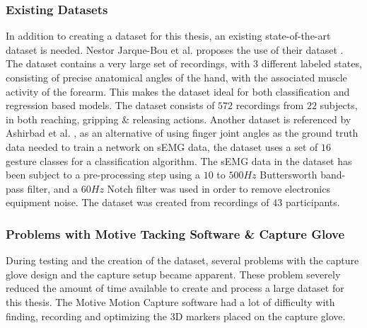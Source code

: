 \documentclass[../main.tex]{subfiles}
\begin{document}
\subsubsection{Existing Datasets}

In addition to creating a dataset for this thesis, an existing state-of-the-art dataset is needed.
Nestor Jarque-Bou et al. \cite{jarque2019} proposes the use of their dataset \cite{kinmusdataset}.
The dataset contains a very large set of recordings, with 3 different labeled states, consisting of precise anatomical angles of the hand, with the associated muscle activity of the forearm.
This makes the dataset ideal for both classification and regression based models.
The dataset consists of $572$ recordings from $22$ subjects, in both reaching, gripping \& releasing actions.
Another dataset is referenced by Ashirbad et al. \cite{ashirbad2022}, as an alternative of using finger joint angles as the ground truth data needed to train a network on sEMG data, the dataset uses a set of $16$ gesture classes for a classification algorithm.
The sEMG data in the dataset has been subject to a pre-processing step using a $10$ to $500Hz$ Buttersworth band-pass filter, and a $60Hz$ Notch filter was used in order to remove electronics equipment noise.
The dataset was created from recordings of $43$ participants.

\subsubsection{Problems with Motive Tacking Software \& Capture Glove}
\label{sec:motiveproblems}

During testing and the creation of the dataset, several problems with the capture glove design and the capture setup became apparent.
These problem severely reduced the amount of time available to create and process a large dataset for this thesis.
The Motive Motion Capture software \cite{motive} had a lot of difficulty with finding, recording and optimizing the 3D markers placed on the capture glove.
\end{document}
